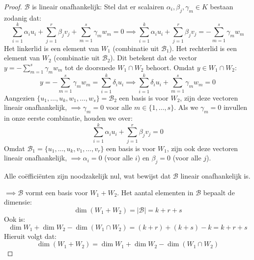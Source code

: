 \begin{proof}
    $\mathcal{B}$ is lineair onafhankelijk:
    Stel dat er scalairen $\alpha_i, \beta_j, \gamma_m \in K$ bestaan zodanig dat:
    $$ \sum_{i=1}^k \alpha_i u_i + \sum_{j=1}^r \beta_j v_j + \sum_{m=1}^s \gamma_m w_m = 0 
     \implies \sum_{i=1}^k \alpha_i u_i + \sum_{j=1}^r \beta_j v_j = -\sum_{m=1}^s \gamma_m w_m $$
    Het linkerlid is een element van $W_1$ (combinatie uit $\mathcal{B}_1$). Het rechterlid is een element van $W_2$ (combinatie uit $\mathcal{B}_2$). 
    Dit betekent dat de vector $y = -\sum_{m=1}^s \gamma_m w_m$ tot de doorsnede $W_1 \cap W_2$ behoort.
    Omdat $y \in W_1 \cap W_2$:
    $$ y = -\sum_{m=1}^s \gamma_m w_m = \sum_{i=1}^k \delta_i u_i 
    \implies \sum_{i=1}^k \delta_i u_i + \sum_{m=1}^s \gamma_m w_m = 0 $$
    Aangezien $\{u_1, \dots, u_k, w_1, \dots, w_s\} = \mathcal{B}_2$ een basis is voor $W_2$, 
    zijn deze vectoren lineair onafhankelijk, $\implies \gamma_m = 0$ voor alle $m \in \{1, \dots, s\}$.
    Als we $\gamma_m = 0$ invullen in onze eerste combinatie, houden we over:
    $$ \sum_{i=1}^k \alpha_i u_i + \sum_{j=1}^r \beta_j v_j = 0 $$
    Omdat $\mathcal{B}_1 = \{u_1, \dots, u_k, v_1, \dots, v_r\}$ een basis is voor $W_1$,
    zijn ook deze vectoren lineair onafhankelijk,  $\implies \alpha_i = 0$ (voor alle $i$) en $\beta_j = 0$ (voor alle $j$).

    Alle coëfficiënten zijn noodzakelijk nul, wat bewijst dat $\mathcal{B}$ lineair onafhankelijk is.

    \(\implies \mathcal{B}\) vormt een basis voor $W_1 + W_2$. Het aantal elementen in $\mathcal{B}$ bepaalt de dimensie:
    $$ \dim(W_1 + W_2) = |\mathcal{B}| = k + r + s $$
    Ook is:
    $$ \dim W_1 + \dim W_2 - \dim(W_1 \cap W_2) = (k + r) + (k + s) - k = k + r + s $$
    Hieruit volgt dat:
    $$ \dim(W_1 + W_2) = \dim W_1 + \dim W_2 - \dim(W_1 \cap W_2) $$
\end{proof}

